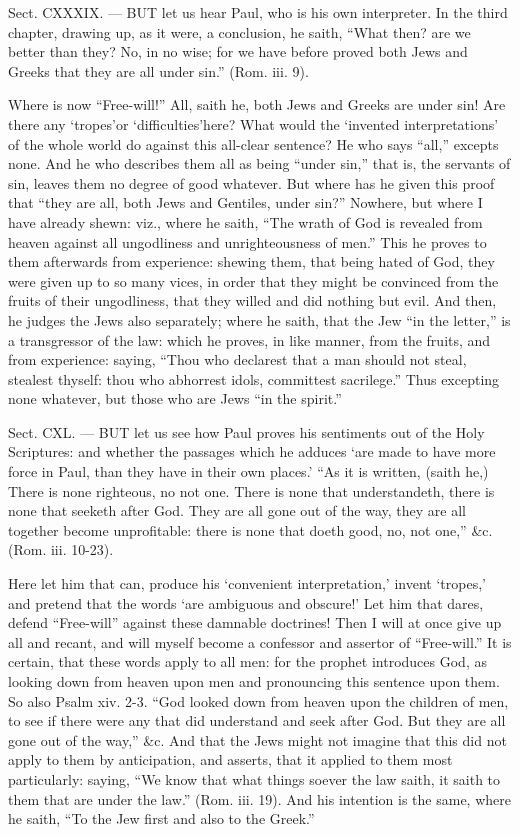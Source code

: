 
Sect. CXXXIX. — BUT let us hear Paul, who is his own interpreter. In the third chapter, drawing up, as it were, a conclusion, he saith, “What then? are we better than they? No, in no wise; for we have before proved both Jews and Greeks that they are all under sin.” (Rom. iii. 9).

Where is now “Free-will!” All, saith he, both Jews and Greeks are under sin! Are there any ‘tropes’or ‘difficulties’here? What would the ‘invented interpretations’ of the whole world do against this all-clear sentence? He who says “all,” excepts none. And he who describes them all as being “under sin,” that is, the servants of sin, leaves them no degree of good whatever. But where has he given this proof that “they are all, both Jews and Gentiles, under sin?” Nowhere, but where I have already shewn: viz., where he saith, “The wrath of God is revealed from heaven against all ungodliness and unrighteousness of men.” This he proves to them afterwards from experience: shewing them, that being hated of God, they were given up to so many vices, in order that they might be convinced from the fruits of their ungodliness, that they willed and did nothing but evil. And then, he judges the Jews also separately; where he saith, that the Jew “in the letter,” is a transgressor of the law: which he proves, in like manner, from the fruits, and from experience: saying, “Thou who declarest that a man should not steal, stealest thyself: thou who abhorrest idols, committest sacrilege.” Thus excepting none whatever, but those who are Jews “in the spirit.”


Sect. CXL. — BUT let us see how Paul proves his sentiments out of the Holy Scriptures: and whether the passages which he adduces ‘are made to have more force in Paul, than they have in their own places.’ “As it is written, (saith he,) There is none righteous, no not one. There is none that understandeth, there is none that seeketh after God. They are all gone out of the way, they are all together become unprofitable: there is none that doeth good, no, not one,” \&c. (Rom. iii. 10-23).

Here let him that can, produce his ‘convenient interpretation,’ invent ‘tropes,’ and pretend that the words ‘are ambiguous and obscure!’ Let him that dares, defend “Free-will” against these damnable doctrines! Then I will at once give up all and recant, and will myself become a confessor and assertor of “Free-will.” It is certain, that these words apply to all men: for the prophet introduces God, as looking down from heaven upon men and pronouncing this sentence upon them. So also Psalm xiv. 2-3. “God looked down from heaven upon the children of men, to see if there were any that did understand and seek after God. But they are all gone out of the way,” \&c. And that the Jews might not imagine that this did not apply to them by anticipation, and asserts, that it applied to them most particularly: saying, “We know that what things soever the law saith, it saith to them that are under the law.” (Rom. iii. 19). And his intention is the same, where he saith, “To the Jew first and also to the Greek.”

